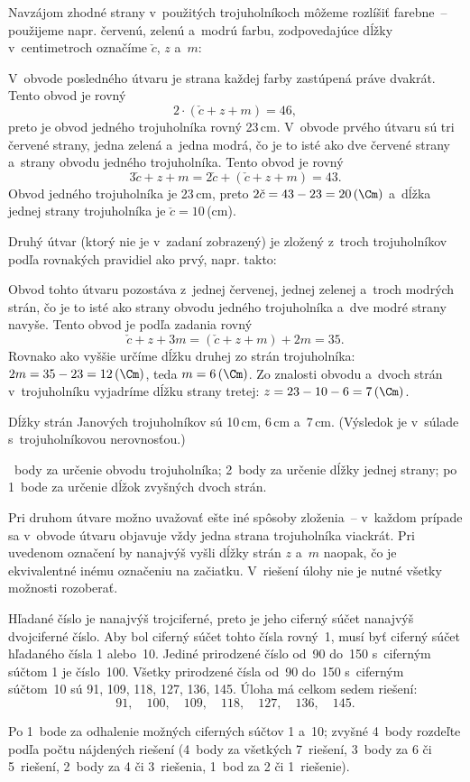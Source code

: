 {%
\def\c{\check c}
Navzájom zhodné strany v~použitých trojuholníkoch môžeme rozlíšiť
farebne~-- použijeme napr. červenú, zelenú a~modrú farbu,
zodpovedajúce dĺžky v~centimetroch označíme $\c$, $z$ a~$m$:
%

V~obvode posledného útvaru je strana každej farby zastúpená práve dvakrát.
Tento obvod je rovný
$$
2\cdot(\c+z+m)=46,
$$
preto je obvod jedného trojuholníka rovný 23\,cm.
V~obvode prvého útvaru sú tri červené strany, jedna zelená a~jedna modrá,
čo je to isté ako dve červené strany a~strany obvodu jedného trojuholníka.
Tento obvod je rovný
$$
3\c+z+m=2\c+(\c+z+m)=43.
$$
Obvod jedného trojuholníka je 23\,cm, preto
$2\c=43-23=20\,(\Cm)$ a~dĺžka jednej strany trojuholníka je $\c=10$\,(cm).

Druhý útvar (ktorý nie je v~zadaní zobrazený) je zložený z~troch trojuholníkov
podľa rovnakých pravidiel ako prvý, napr. takto:
%

Obvod tohto útvaru pozostáva z~jednej červenej, jednej zelenej a~troch modrých
strán, čo je to isté ako strany obvodu jedného trojuholníka a~dve modré
strany navyše.
Tento obvod je podľa zadania rovný
$$
\c+z+3m=(\c+z+m)+2m=35.
$$
Rovnako ako vyššie určíme dĺžku druhej zo strán trojuholníka:
$2m=35-23=12\,(\Cm)$, teda $m=6\,(\Cm)$.
Zo znalosti obvodu a~dvoch strán v~trojuholníku vyjadríme dĺžku strany tretej:
$z=23-10-6=7\,(\Cm)$.

Dĺžky strán Janových trojuholníkov sú 10\,cm, 6\,cm a~7\,cm.
(Výsledok je v~súlade s~trojuholníkovou nerovnosťou.)

~body za určenie obvodu trojuholníka;
2~body za určenie dĺžky jednej strany;
po 1~bode za určenie dĺžok zvyšných dvoch strán.

\poznamka
Pri druhom útvare možno uvažovať ešte iné spôsoby zloženia~--
v~každom prípade sa v~obvode útvaru objavuje vždy jedna strana trojuholníka
viackrát.
Pri uvedenom označení by nanajvýš vyšli dĺžky strán $z$ a~$m$ naopak, čo je
ekvivalentné inému označeniu na začiatku.
V~riešení úlohy nie je nutné všetky možnosti rozoberať.
\endhodnotenie
}

{%
Hľadané číslo je nanajvýš trojciferné, preto je jeho ciferný súčet
nanajvýš dvojciferné číslo. Aby bol ciferný súčet tohto čísla
rovný~1, musí byť ciferný súčet hľadaného čísla 1 alebo~10. Jediné
prirodzené číslo od~90 do~150 s~ciferným súčtom 1 je číslo~100.
Všetky prirodzené čísla od~90 do~150 s~ciferným súčtom~10 sú 91,
109, 118, 127, 136, 145. Úloha má celkom sedem riešení:
$$
91,\quad 100,\quad 109,\quad 118,\quad 127,\quad 136,\quad 145.
$$

\hodnotenie
Po 1~bode za odhalenie možných ciferných súčtov 1 a~10;
zvyšné 4~body rozdeľte podľa počtu nájdených riešení
(4~body za všetkých 7~riešení, 3~body za 6 či 5~riešení, 2~body za 4 či 3~riešenia,
1~bod za 2 či 1~riešenie).
\endhodnotenie
}

